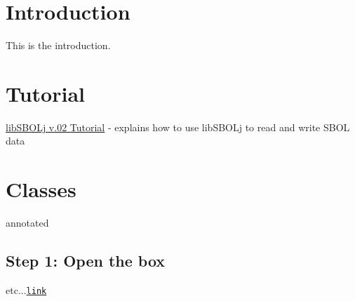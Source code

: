 \hypertarget{index_intro}{}\section{Introduction}\label{index_intro}
This is the introduction.\hypertarget{index_tutorial_sec}{}\section{Tutorial}\label{index_tutorial_sec}

\begin{DoxyItemize}
\item \hyperlink{tutorial}{libSBOLj v.02 Tutorial} -\/ explains how to use libSBOLj to read and write SBOL data
\end{DoxyItemize}\hypertarget{index_class_sec}{}\section{Classes}\label{index_class_sec}

\begin{DoxyItemize}
\item annotated
\end{DoxyItemize}\hypertarget{index_step1}{}\subsection{Step 1: Open the box}\label{index_step1}
etc...\href{http://link.html}{\tt link} 
